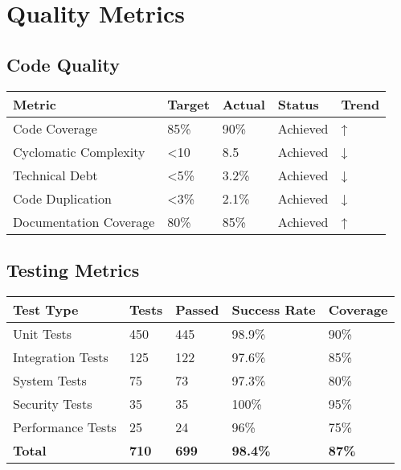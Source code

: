 \documentclass[12pt,a4paper]{article}
\begin{document}
\section{Quality Metrics}

\subsection{Code Quality}
\begin{longtable}{|p{4cm}|p{3cm}|p{3cm}|p{3cm}|p{3cm}|}
\hline
\rowcolor{lightgray}
\textbf{Metric} & \textbf{Target} & \textbf{Actual} & \textbf{Status} & \textbf{Trend} \\
\hline
Code Coverage & 85\% & 90\% & \cellcolor{completedgreen}Achieved & ↑ \\
\hline
Cyclomatic Complexity & <10 & 8.5 & \cellcolor{completedgreen}Achieved & ↓ \\
\hline
Technical Debt & <5\% & 3.2\% & \cellcolor{completedgreen}Achieved & ↓ \\
\hline
Code Duplication & <3\% & 2.1\% & \cellcolor{completedgreen}Achieved & ↓ \\
\hline
Documentation Coverage & 80\% & 85\% & \cellcolor{completedgreen}Achieved & ↑ \\
\hline
\end{longtable}

\subsection{Testing Metrics}
\begin{longtable}{|p{4cm}|p{3cm}|p{3cm}|p{3cm}|p{3cm}|}
\hline
\rowcolor{lightgray}
\textbf{Test Type} & \textbf{Tests} & \textbf{Passed} & \textbf{Success Rate} & \textbf{Coverage} \\
\hline
Unit Tests & 450 & 445 & 98.9\% & 90\% \\
\hline
Integration Tests & 125 & 122 & 97.6\% & 85\% \\
\hline
System Tests & 75 & 73 & 97.3\% & 80\% \\
\hline
Security Tests & 35 & 35 & 100\% & 95\% \\
\hline
Performance Tests & 25 & 24 & 96\% & 75\% \\
\hline
\textbf{Total} & \textbf{710} & \textbf{699} & \textbf{98.4\%} & \textbf{87\%} \\
\hline
\end{longtable}
\end{document}

